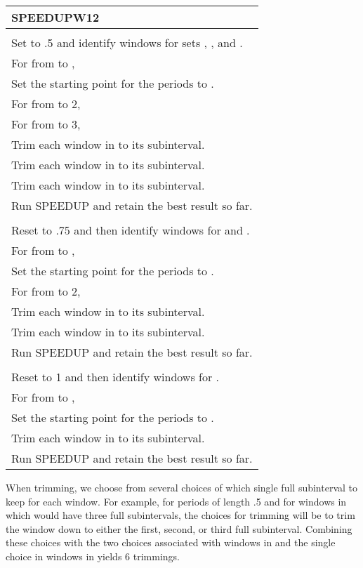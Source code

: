 \documentclass[11pt]{article}
\newcommand{\tab}{\hspace{.25in}}
\begin{document}
\begin{table}[!htb]
\begin{tabular}{l}
\toprule
\textbf{SPEEDUPW12}\\
\midrule
\tab {\it PHASE 1:}\\
\tab Set  to .5 and identify windows for sets , , and .\\
\tab For  from  to ,\\
\tab \tab Set the starting point for the periods to .\\
\tab \tab For  from  to 2,\\
\tab \tab \tab For  from  to 3,\\
\tab \tab \tab \tab Trim each window in  to its  subinterval.\\
\tab \tab \tab \tab Trim each window in  to its  subinterval.\\
\tab \tab \tab \tab Trim each window in  to its  subinterval.\\
\tab \tab \tab \tab Run SPEEDUP and retain the best result so far.\\
\tab {\it PHASE 2:}\\
\tab Reset  to .75 and then identify windows for  and .\\
\tab For  from  to ,\\
\tab \tab Set the starting point for the periods to .\\
\tab \tab For  from  to 2,\\
\tab \tab \tab Trim each window in  to its  subinterval.\\
\tab \tab \tab Trim each window in  to its  subinterval.\\
\tab \tab \tab Run SPEEDUP and retain the best result so far.\\
\tab {\it PHASE 3:}\\
\tab Reset  to 1 and then identify windows for .\\
\tab For  from  to ,\\
\tab \tab Set the starting point for the periods to .\\
\tab \tab Trim each window in  to its  subinterval.\\
\tab \tab Run SPEEDUP and retain the best result so far.\\
\bottomrule
\end{tabular}
\end{table}


When trimming, we choose from several choices of which single full subinterval to keep for each window.  For example, for periods of length .5 and for windows in  which would have three full subintervals, the choices for trimming will be to trim the window down to either the first, second, or third full subinterval.  Combining these choices with the two choices associated with windows in  and the single choice in windows in  yields 6 trimmings.
\end{document}
